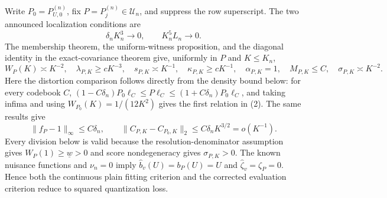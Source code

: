 Write \(P_0=P_{U,0}^{(n)}\), fix \(P=P_j^{(n)}\in\mathcal U_n\), and suppress the row superscript.  The two announced localization conditions are
\[
 \delta_nK_n^3\longrightarrow0,
 \qquad K_n^5L_n\longrightarrow0.                                             \tag{1}
\]
The membership theorem, the uniform-witness proposition, and the diagonal identity in the exact-covariance theorem give, uniformly in \(P\) and \(K\leq K_n\),
\[
 W_P(K)\asymp K^{-2},\quad \lambda_{P,K}\geq cK^{-3},\quad
 s_{P,K}\asymp K^{-1},\quad \kappa_{P,K}\geq cK^{-1},\quad
 \alpha_{P,K}=1,\quad M_{P,K}\leq C,\quad \sigma_{P,K}\asymp K^{-2}.        \tag{2}
\]
Here the distortion comparison follows directly from the density bound below: for every codebook \(C\), \((1-C\delta_n)P_0\ell_C\leq P\ell_C\leq(1+C\delta_n)P_0\ell_C\), and taking infima and using \(W_{P_0}(K)=1/(12K^2)\) gives the first relation in (2).  The same results give
\[
 \|f_P-1\|_\infty\leq C\delta_n,\qquad
 \|C_{P,K}-C_{P_0,K}\|_2\leq C\delta_nK^{3/2}=o(K^{-1}).                    \tag{3}
\]
Every division below is valid because the resolution-denominator assumption gives \(W_P(1)\geq\underline w>0\) and score nondegeneracy gives \(\sigma_{P,K}>0\).  The known nuisance functions and \(\nu_n=0\) imply \(\widehat b_v(U)=b_P(U)=U\) and \(\widehat\zeta_v=\zeta_P=0\).  Hence both the continuous plain fitting criterion and the corrected evaluation criterion reduce to squared quantization loss.

